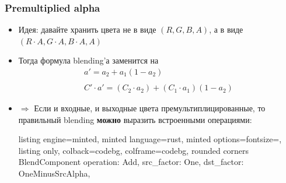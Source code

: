 \documentclass[10pt]{beamer}
\begin{document}
\begin{frame}[fragile]
\frametitle{Premultiplied alpha}
\begin{itemize}
\item Идея: давайте хранить цвета не в виде \begin{math}(R,G,B,A)\end{math}, а в виде \begin{math}(R\cdot A, G\cdot A, B\cdot A, A)\end{math}
\pause
\item Тогда формула blending'а заменится на
\begin{equation*}
\begin{matrix}
a' = a_2+a_1(1-a_2) \\
\\
C'\cdot a' = (C_2\cdot a_2)+(C_1\cdot a_1)(1-a_2)
\end{matrix}
\end{equation*}
\pause
\item \begin{math}\Longrightarrow\end{math} Если и входные, и выходные цвета премультиплицированные, то правильный blending \textbf{можно} выразить встроенными операциями: 
\begin{tcblisting}{listing engine=minted, minted language=rust, minted options={fontsize=\scriptsize}, listing only, colback=codebg, colframe=codebg, rounded corners}
BlendComponent {
  operation: Add,
  src_factor: One,
  dst_factor: OneMinusSrcAlpha,
}
\end{tcblisting}
\end{itemize}
\end{frame}
\end{document}
